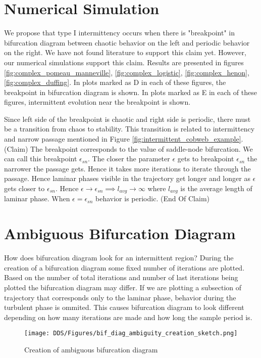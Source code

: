 \section{Numerical Simulation}
We propose that type I intermittency occurs when there is "breakpoint" in bifurcation diagram between chaotic behavior on the left and periodic behavior on the right.
We have not found literature to support this claim yet.
However, our numerical simulations support this claim.
Results are presented in figures \ref{fig:complex_pomeau_manneville}, \ref{fig:complex_logistic}, \ref{fig:complex_henon}, \ref{fig:complex_duffing}.
In plots marked as D in each of these figures, the breakpoint in bifurcation diagram is shown.
In plots marked as E in each of these figures, intermittent evolution near the breakpoint is shown.
\par
Since left side of the breakpoint is chaotic and right side is periodic, there must be a transition from chaos to stability.
This transition is related to intermittency and narrow passage mentioned in Figure \ref{fig:intermittent_cobweb_example}.
(Claim) The breakpoint corresponds to the value of saddle-node bifurcation.
We can call this breakpoint $\epsilon_{sn}$.
The closer the parameter $\epsilon$ gets to breakpoint $\epsilon_{sn}$ the narrower the passage gets.
Hence it takes more iterations to iterate through the passage.
Hence laminar phases visible in the trajectory get longer and longer as $\epsilon$ gets closer to $\epsilon_{sn}$.
Hence $\epsilon \rightarrow \epsilon_{sn} \implies l_{avg} \rightarrow \infty$ where $l_{avg}$ is the average length of laminar phase.
When $\epsilon = \epsilon_{sn}$ behavior is periodic.
(End Of Claim)

\section{Ambiguous Bifurcation Diagram}
How does bifurcation diagram look for an intermittent region?
During the creation of a bifurcation diagram some fixed number of iterations are plotted.
Based on the number of total iterations and number of last iterations being plotted the bifurcation diagram may differ.
If we are plotting a subsection of trajectory that corresponds only to the laminar phase, behavior during the turbulent phase is ommited.
This causes bifurcation diagram to look different depending on how many iterations are made and how long the sample period is.
\par
\begin{figure}[!h]
    \centering
    \texttt{[image: DDS/Figures/bif\_diag\_ambiguity\_creation\_sketch.png]}
    \caption{Creation of ambiguous bifurcation diagram}
    \label{fig:ambiguous_bif_diag}
\end{figure}

